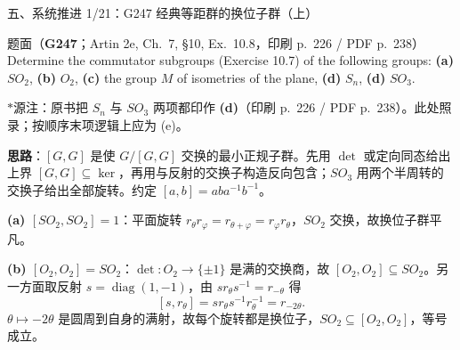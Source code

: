 \documentclass[aspectratio=169,10pt,fontset=none]{ctexbeamer}
\newcommand{\ex}[1]{\textcolor{accent}{\footnotesize\bfseries #1}}
\newcommand{\key}[1]{\textcolor{ink}{\bfseries #1}}
\newcommand{\starpt}{\textcolor{accent}{\bfseries$\ast$}}
\begin{document}
\begin{frame}[t]{五、系统推进 1/21：G247 经典等距群的换位子群（上）}
\label{ex:G247}
\scriptsize
\begin{block}{\footnotesize 题面（\ex{G247}；Artin 2e, Ch.~7, §10, Ex.~10.8，印刷 p.~226 / PDF p.~238）}
Determine the commutator subgroups (Exercise 10.7) of the following groups: \textbf{(a)} $SO_2$, \textbf{(b)} $O_2$, \textbf{(c)} the group $M$ of isometries of the plane, \textbf{(d)} $S_n$, \textbf{(d)} $SO_3$.
\end{block}
\starpt 源注：原书把 $S_n$ 与 $SO_3$ 两项都印作 \textbf{(d)}（印刷 p.~226 / PDF p.~238）。此处照录；按顺序末项逻辑上应为 (e)。

\key{思路}：$[G,G]$ 是使 $G/[G,G]$ 交换的最小正规子群。先用 $\det$ 或定向同态给出上界 $[G,G]\subseteq\ker$，再用与反射的交换子构造反向包含；$SO_3$ 用两个半周转的交换子给出全部旋转。约定 $[a,b]=aba^{-1}b^{-1}$。

\key{(a) $[SO_2,SO_2]=1$}：平面旋转 $r_\theta r_\varphi=r_{\theta+\varphi}=r_\varphi r_\theta$，$SO_2$ 交换，故换位子群平凡。

\key{(b) $[O_2,O_2]=SO_2$}：$\det:O_2\to\{\pm1\}$ 是满的交换商，故 $[O_2,O_2]\subseteq SO_2$。另一方面取反射 $s=\operatorname{diag}(1,-1)$，由 $sr_\theta s^{-1}=r_{-\theta}$ 得
\[ [s,r_\theta]=s r_\theta s^{-1}r_\theta^{-1}=r_{-2\theta}. \]
$\theta\mapsto-2\theta$ 是圆周到自身的满射，故每个旋转都是换位子，$SO_2\subseteq[O_2,O_2]$，等号成立。
\end{frame}
\end{document}
